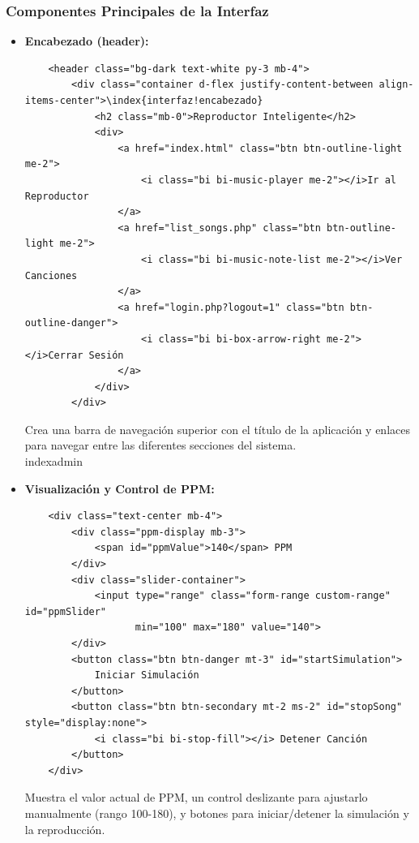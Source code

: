\documentclass[a4paper,12pt]{article}
\begin{document}
\subsubsection{Componentes Principales de la Interfaz}
\begin{itemize}
    \item \textbf{Encabezado (header):}
    \begin{verbatim}
    <header class="bg-dark text-white py-3 mb-4">
        <div class="container d-flex justify-content-between align-items-center">\index{interfaz!encabezado}
            <h2 class="mb-0">Reproductor Inteligente</h2>
            <div>
                <a href="index.html" class="btn btn-outline-light me-2">
                    <i class="bi bi-music-player me-2"></i>Ir al Reproductor
                </a>
                <a href="list_songs.php" class="btn btn-outline-light me-2">
                    <i class="bi bi-music-note-list me-2"></i>Ver Canciones
                </a>
                <a href="login.php?logout=1" class="btn btn-outline-danger">
                    <i class="bi bi-box-arrow-right me-2"></i>Cerrar Sesión
                </a>
            </div>
        </div>
    \end{verbatim}
    Crea una barra de navegación superior con el título de la aplicación y enlaces para navegar entre las diferentes secciones del sistema.\\indexadmin

    \item \textbf{Visualización y Control de PPM:}
    \begin{verbatim}
    <div class="text-center mb-4">
        <div class="ppm-display mb-3">
            <span id="ppmValue">140</span> PPM
        </div>
        <div class="slider-container">
            <input type="range" class="form-range custom-range" id="ppmSlider" 
                   min="100" max="180" value="140">
        </div>
        <button class="btn btn-danger mt-3" id="startSimulation">
            Iniciar Simulación
        </button>
        <button class="btn btn-secondary mt-2 ms-2" id="stopSong" style="display:none">
            <i class="bi bi-stop-fill"></i> Detener Canción
        </button>
    </div>
    \end{verbatim}
    Muestra el valor actual de PPM, un control deslizante para ajustarlo manualmente (rango 100-180), y botones para iniciar/detener la simulación y la reproducción.


\end{itemize}
\end{document}

